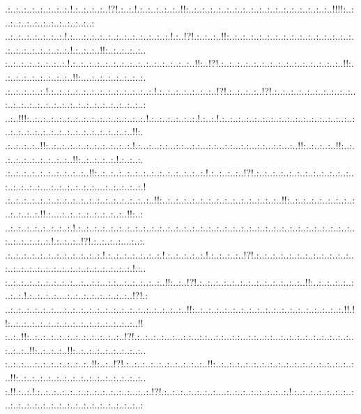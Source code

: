 \documentclass[paper=a4, fontsize=11pt]{scrartcl} %
\numberwithin{equation}{section} %
\numberwithin{figure}{section} %
\numberwithin{table}{section} %
\begin{document}
.:..:..:..:..:..:..:..:.!.:..:..:..:..!?!.:..:.!.:..:..:..:..:..!!:..:..:..:..:..:..:..:..:..:..:..:..:..:..:..:..:..:..!!!!:..:..:..:..:..:..:..:..:..:..:..:..:\\..:..:..:..:..:..:..:.!.:....:..:..:..:..:..:..:..:..:..:..:.!.:..!?!.:..:..:..!!:..:..:..:..:..:..:..:..:..:..:..:..:..:..:..:..:..:..:..:..:..:..:..:.!.:..:..:..!!:..:..:..:..:..\\:..:..:..:..:..:..:..:.!.:..:..:..:..:..:..:..:..:..:..:..:..:..:..:..!!:..!?!.:..:..:..:..:..:..:..:..:..:..:..:..:..:..:..!!:..:..:..:..:..:..:..:..:..!!:....:..:..:..:..:..:..:.\\.:..:..:..:..:.!.:..:..:..:..:..:..:..:..:..:..:..:..:.!.:..:..:..:..:..:..:..!?!.:..:..:..:..!?!.:..:..:..:..:..:..:..:..:..:..:..:..:..:..:..:..:..:..:..:..:..:..:..:..:..:..:..:\\..:..!!!:..:..:..:..:..:..:..:..:..:..:..:..:..:..:.!.:..:..:..:..:..:.!.:..:.!.:..:..:..:..:..:..:..:..:..:..:..:..:..:..:..:..:..:..:..:..:..:..:..:..:..:..:..:..:..:..:..:..!!:.\\.:..:..:..:..!!:..:..:..:..:..:..:..:..:..:..:.!.:...:...:.:...:.:...:.:...:.:...:.:...:.:...:.:...:.:...:..!!:..:..:..:..!!:..:..:..:..:..:..:..:..:..:..!!:..:..:..:..:.!.:..:..:.\\.:..:..:..:..:..:..:..:..:..:..!!:..:..:..:..:..:..:..:..:..:..:..:..:..:.!.:..:..:..:..!?!.:..:..:..:..:..:..:..:..:..:..:..:..:..:..:..:..:....:..:..:..:..:..:....:..:..:..:..:.!\\.:..:..:..:..:..:..:..:..:..:..:..:..:..:..:..:..:..:..!!:..:..:..:..:..:..:..:..:..:..:..:..:..:..:..!!:..:..:..:..:..:..:..:..:..:..:..:..:.!!.:....:..:..:..:..:..:..:..:..!!:..:\\..:..:..:..:..:..:..:..:.!.:..:..:..:..:..:..:..:..:..:..:..:..:..:..:..:..:..:..:..:..:..:..:..:..:..:..:..:..:..:..:..:..:..:..:..:..:..:..:..:.!.:..:..:..!?!.:..:..:..:....:..:.\\.:..:..:..:..:..:..:..:..:..:..:..:.!.:..:..:..:..:..:..:.!.:..:..:..:..:.!.:..:..:..:..!?!.:..:..:..:..:..:..:..:..:..:..:..:..:..:..:..:..:..:..:..:..:..:..:..:..:..:..:..:.!.:..\\:..:..:..:..:..:..:..:..:...:...:.:...:.:...:..:..:..:..:..!!:..:..!?!.:..:..:..:..:..:..:..:..:..:..:..:..:..!!:..:..:..:..:..:..:..:.!.:..:..:..:....:..:..:..:..:..:..:..:..!?!.:\\..:..:..:..:..:..:....:..:..:..:..:..:..:..:..:..:..:..:..:..:..:..!!:..:..:..:..:..:..:..:..:..:..:..:..:..:..:..:..:..:..:.!!.!!:..:..:..:..:..:..:..:..:..:..:..:..:..:..:..:..!!\\:..:..!!:..:..:..:..:..:..:..:..:..:..:..:..!?!.:..:..:..:...:...:.:...:.:...:.:...:.:...:.:...:.:...:..:..:..:..:..:..:..:..:..:..:..:..!!:..:..:..:..!!:..:..:..:..:..:..:..:..:..\\:..:..:....:..:..:..:..:..:..:..!!:..:..!?!.:..:..:..:..:..:..:..:..:..:..!!:..:..:..:..:..:..:..:..:..:..:..:..:..:..:..:..:..:..!!:..:..:..:..:..:..:..:..:..:..:..:..:..:..:..:..\\:.!!.:..:.!.:..:..:..:..:..:..:..:..:..:..:..:...:..:.!?!.:..:..:..:..:..:..:....:..:..:..:..:..:..:..:.!.:..:..:..:..:..:..:..:..:..:..:..:..:..:..:..:..:..:..:..:..:..:..:..:..:
\end{document}
